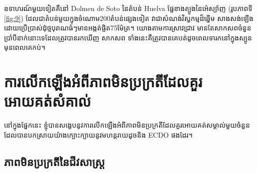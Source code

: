 \documentclass[10pt,twocolumn,letterpaper]{article}
\begin{document}
ឧទាហរណ៍មួយទៀតគឺនៅ Dolmen de Soto នៃតំបន់ Huelva ផ្នែខាងត្បូងនៃអ៉េស្ប៉ាញ (រូបភាពទី \ref{fig:9}) ដែលជាតំបន់មួយក្នុងចំណោម200តំបន់ផ្សេងទៀត\cite{72,32} វាជាសំណង់វិស្វកម្មដ៏ឆ្នើម សាងសង់ឡើងដោយប្រើប្រាស់ដុំថ្មបុរាណធំៗមានអង្កត់ផ្ចិត75ម៉ែត្រ។ យោងតាមការស្រាវជ្រាវ មានតែសាកសពចំនួនប្រាំបីនាក់នោះទេដែលត្រូវបានរកឃើញ សាកសព ទាំងនេះគឺត្រូវបានគេបត់ដូចពេលទារកនៅក្នុងស្បូនមុនពេលគេកប់។

\section{ការលើកឡើងអំពីភាពមិនប្រក្រតីដែលគួរអោយគត់សំគាល់}

នៅក្នុងផ្នែកនេះ ខ្ញុំបានសង្ខេបនូវការលើកឡើងអំពីភាពមិនប្រក្រតីដែលគួរអោយគត់សម្គាល់មួយចំនួនដែលបានបកស្រាយយ៉ាងក្បោះក្បាយនូវមហន្តរាយដូចនិង ECDO ផងដែរ។

\subsection{ភាពមិនប្រក្រតីនៃជីវសាស្ត្រ}
\end{document}
